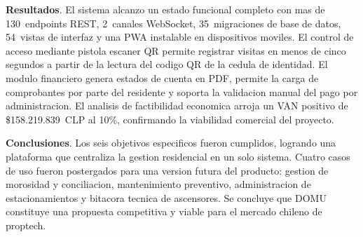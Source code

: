 
\medskip
\noindent\textbf{Resultados}. El sistema alcanzo un estado funcional completo con mas de 130~endpoints REST, 2~canales WebSocket, 35~migraciones de base de datos, 54~vistas de interfaz y una PWA instalable en dispositivos moviles. El control de acceso mediante pistola escaner QR permite registrar visitas en menos de cinco segundos a partir de la lectura del codigo QR de la cedula de identidad. El modulo financiero genera estados de cuenta en PDF, permite la carga de comprobantes por parte del residente y soporta la validacion manual del pago por administracion. El analisis de factibilidad economica arroja un VAN positivo de \$158.219.839~CLP al 10\%, confirmando la viabilidad comercial del proyecto.

\medskip
\noindent\textbf{Conclusiones}. Los seis objetivos especificos fueron cumplidos, logrando una plataforma que centraliza la gestion residencial en un solo sistema. Cuatro casos de uso fueron postergados para una version futura del producto: gestion de morosidad y conciliacion, mantenimiento preventivo, administracion de estacionamientos y bitacora tecnica de ascensores. Se concluye que DOMU constituye una propuesta competitiva y viable para el mercado chileno de proptech.


